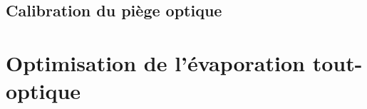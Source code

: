 \subsection{Calibration du piège optique}

\section{Optimisation de l'évaporation tout-optique}
\label{sc:evap_optique}

\begin{comment}

%
%



\section{Models of confidence in perceptual decision-making}


\end{comment}
